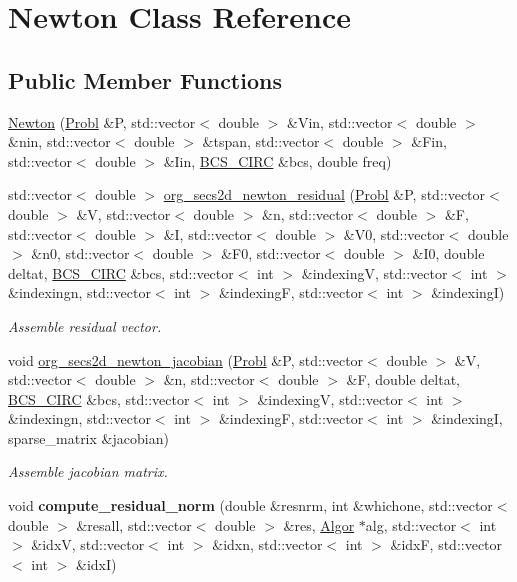 \hypertarget{classNewton}{\section{Newton Class Reference}
\label{classNewton}
}
\subsection*{Public Member Functions}
\begin{DoxyCompactItemize}
\item 
\hyperlink{classNewton_a9c16869fbc51f1d2f3ebcea9c3085c87}{Newton} (\hyperlink{classProbl}{Probl} \&P, std\-::vector$<$ double $>$ \&Vin, std\-::vector$<$ double $>$ \&nin, std\-::vector$<$ double $>$ \&tspan, std\-::vector$<$ double $>$ \&Fin, std\-::vector$<$ double $>$ \&Iin, \hyperlink{classBCS__CIRC}{B\-C\-S\-\_\-\-C\-I\-R\-C} \&bcs, double freq)
\item 
std\-::vector$<$ double $>$ \hyperlink{classNewton_ab67a77fb06e13d62174d1bfa6c8a056c}{org\-\_\-secs2d\-\_\-newton\-\_\-residual} (\hyperlink{classProbl}{Probl} \&P, std\-::vector$<$ double $>$ \&V, std\-::vector$<$ double $>$ \&n, std\-::vector$<$ double $>$ \&F, std\-::vector$<$ double $>$ \&I, std\-::vector$<$ double $>$ \&V0, std\-::vector$<$ double $>$ \&n0, std\-::vector$<$ double $>$ \&F0, std\-::vector$<$ double $>$ \&I0, double deltat, \hyperlink{classBCS__CIRC}{B\-C\-S\-\_\-\-C\-I\-R\-C} \&bcs, std\-::vector$<$ int $>$ \&indexing\-V, std\-::vector$<$ int $>$ \&indexingn, std\-::vector$<$ int $>$ \&indexing\-F, std\-::vector$<$ int $>$ \&indexing\-I)
\begin{DoxyCompactList}\small\item\em Assemble residual vector. \end{DoxyCompactList}\item 
void \hyperlink{classNewton_aceb38cf5f17f15c22ec820077ae212ca}{org\-\_\-secs2d\-\_\-newton\-\_\-jacobian} (\hyperlink{classProbl}{Probl} \&P, std\-::vector$<$ double $>$ \&V, std\-::vector$<$ double $>$ \&n, std\-::vector$<$ double $>$ \&F, double deltat, \hyperlink{classBCS__CIRC}{B\-C\-S\-\_\-\-C\-I\-R\-C} \&bcs, std\-::vector$<$ int $>$ \&indexing\-V, std\-::vector$<$ int $>$ \&indexingn, std\-::vector$<$ int $>$ \&indexing\-F, std\-::vector$<$ int $>$ \&indexing\-I, sparse\-\_\-matrix \&jacobian)
\begin{DoxyCompactList}\small\item\em Assemble jacobian matrix. \end{DoxyCompactList}\item 
\hypertarget{classNewton_a23fbc80090a1b43f4094db0fbad28763}{void {\bfseries compute\-\_\-residual\-\_\-norm} (double \&resnrm, int \&whichone, std\-::vector$<$ double $>$ \&resall, std\-::vector$<$ double $>$ \&res, \hyperlink{classAlgor}{Algor} $\ast$alg, std\-::vector$<$ int $>$ \&idx\-V, std\-::vector$<$ int $>$ \&idxn, std\-::vector$<$ int $>$ \&idx\-F, std\-::vector$<$ int $>$ \&idx\-I)}\label{classNewton_a23fbc80090a1b43f4094db0fbad28763}


\end{DoxyCompactItemize}
